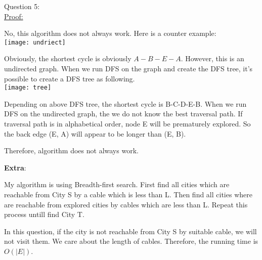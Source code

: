 \documentclass[12pt]{article}
\begin{document}
\pagebreak
\large Question 5: \vspace{5mm}\\
\normalsize 
\setlength{\baselineskip}{8mm}
\underline{Proof:} \par
No, this algorithm does not always work. Here is a counter example: \\
\texttt{[image: undriect]} \par
Obviously, the shortest cycle is obviously $A-B-E-A$. However, this is an undirected graph. When we run DFS on the graph and create the DFS tree, it's possible to create a DFS tree as following. \\
\texttt{[image: tree]} \par
Depending on above DFS tree, the shortest cycle is B-C-D-E-B. When we run DFS on the undirected graph, the we do not know the best traversal path. 
If traversal path is in alphabetical order, node E will be prematurely explored. So the back edge (E, A) will appear to be longer than (E, B). \par
Therefore, algorithm does not always work.




\pagebreak
\large \textbf{Extra}:\\ \vspace{5mm}\par
\normalsize 
\setlength{\baselineskip}{8mm}
My algorithm is using Breadth-first search. First find all cities which are reachable from City S by a cable which is less than L.
Then find all cities where are reachable from explored cities by cables which are less than L. 
Repeat this process untill find City T. \par
In this question, if the city is not reachable from City S by suitable cable, we will not visit them. We care about the length of cables. 
Therefore, the running time is $O(|E|)$.
\end{document}
